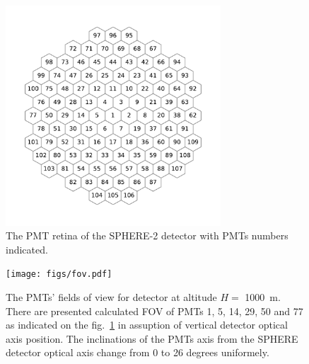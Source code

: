 \documentclass[final,5p,times,twocolumn]{elsarticle}
\begin{document}
\begin{figure}[tb]
\centering
\includegraphics[width=19pc]{figs/retina.pdf}%
\vspace{-1.0pc}
\caption{The PMT retina of the SPHERE-2 detector with PMTs numbers indicated.}
\label{fig:retina}
\end{figure}


\begin{figure}[bth]
\centering
\texttt{[image: figs/fov.pdf]}

\caption{The PMTs' fields of view for detector at altitude $H=$ 1000~m. There are presented calculated FOV of PMTs 1, 5, 14, 29, 50 and 77 as indicated on the fig.~\ref{fig:retina} in assuption of vertical detector optical axis position. The inclinations of the PMTs axis from the SPHERE detector optical axis change from 0 to 26 degrees uniformely.}
\label{fig:pmt_fov}
\end{figure}
\end{document}
